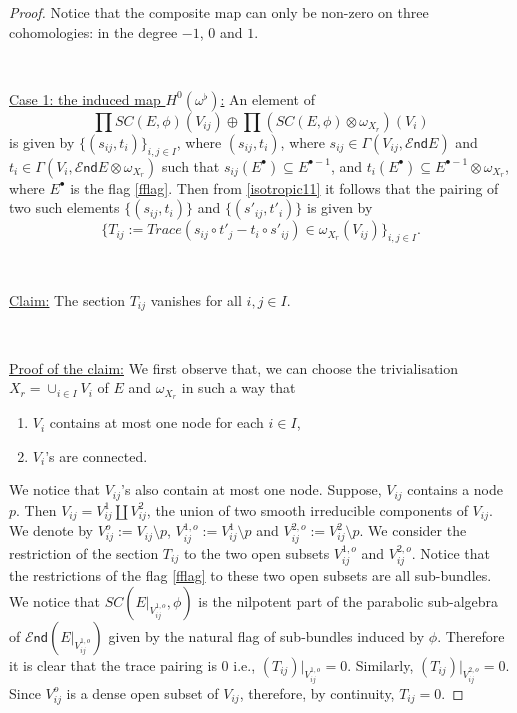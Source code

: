 \documentclass[11pt]{amsart}
\newcommand {\End} {\mathcal E\mathsf{nd}}
\theoremstyle{plain}
\numberwithin{equation}{section}
\theoremstyle{definition}
\theoremstyle{plain}
\begin{document}
\begin{proof}
Notice that the composite map can only be non-zero on three cohomologies: in the degree $-1$, $0$ and $1$. 

\

\underline{Case 1: the induced map $H^0(\omega^{\flat})$:} An element of \[\prod SC(E,\phi)(V_{ij})\oplus \prod(SC(E,\phi)\otimes \omega_{X_r} )({V_i})\] is given by $\{(s_{ij}, t_i)\}_{i,j\in I}$, where $(s_{ij}, t_i)$, where $s_{ij}\in \Gamma(V_{ij}, \End E)$ and $t_i\in \Gamma(V_i, \End E\otimes \omega_{X_r})$ such that $s_{ij}(E^{\bullet})\subseteq E^{\bullet-1}$, and $t_{i}(E^{\bullet})\subseteq E^{\bullet-1}\otimes \omega_{X_r}$, where $E^{\bullet}$ is the flag \eqref{fflag}. Then from \eqref{isotropic11} it follows that the pairing of two such elements $\{(s_{ij}, t_i)\}$ and $\{(s'_{ij}, t'_i)\}$ is given by \[\{T_{ij}:=Trace(s_{ij}\circ t'_j-t_i\circ s'_{ij})\in \omega_{X_r}(V_{ij})\}_{i,j\in I}.\] 

\

\underline{Claim:} The section $T_{ij}$ vanishes for all $i,j\in I$.

\

\underline{Proof of the claim:} We first observe that, we can choose the trivialisation $X_r=\cup_{i\in I} V_i$ of $E$ and $\omega_{X_r}$ in such a way that 
\begin{enumerate}
\item $V_i$ contains at most one node for each $i\in I$, 
\item $V_i$'s are connected.
\end{enumerate}

We notice that $V_{ij}$'s also contain at most one node. Suppose, $V_{ij}$ contains a node $p$. Then $V_{ij}=V^1_{ij}\coprod V^2_{ij}$, the union of two smooth irreducible components of $V_{ij}$. We denote by $V^o_{ij}:=V_{ij}\setminus p$, $V^{1,o}_{ij}:=V^1_{ij}\setminus p$ and $V^{2,o}_{ij}:=V^2_{ij}\setminus p$. We consider the restriction of the section $T_{ij}$ to the two open subsets $V^{1,o}_{ij}$ and $V^{2,o}_{ij}$. Notice that the restrictions of the flag \eqref{fflag} to these two open subsets are all sub-bundles. We notice that $SC(E|_{V^{1,o}_{ij}},\phi)$ is the nilpotent part of the parabolic sub-algebra of $\End (E|_{V^{1,o}_{ij}})$ given by the natural flag of sub-bundles induced by $\phi$. Therefore it is clear that the trace pairing is $0$ i.e., $(T_{ij})|_{V^{1,o}_{ij}}=0$. Similarly, $(T_{ij})|_{V^{2,o}_{ij}}=0$. Since $V^o_{ij}$ is a dense open subset of $V_{ij}$, therefore, by continuity, $T_{ij}=0$. 


\end{proof}
\end{document}
